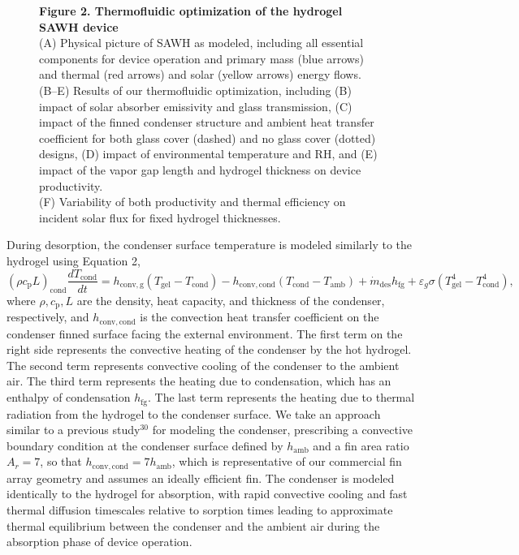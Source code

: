 \documentclass[11pt]{article}
\newcommand{\figbox}[1]{%
  \fbox{\parbox[c][#1][c]{0.92\textwidth}{\centering\itshape [figure image]}}}
\begin{document}
\begin{figure}[!ht]
\centering
\figbox{7cm}
\caption*{\textbf{Figure 2. Thermofluidic optimization of the hydrogel SAWH device}\\
(A) Physical picture of SAWH as modeled, including all essential components for device operation and primary mass (blue arrows) and thermal (red arrows) and solar (yellow arrows) energy flows.\\
(B--E) Results of our thermofluidic optimization, including (B) impact of solar absorber emissivity and glass transmission, (C) impact of the finned condenser structure and ambient heat transfer coefficient for both glass cover (dashed) and no glass cover (dotted) designs, (D) impact of environmental temperature and RH, and (E) impact of the vapor gap length and hydrogel thickness on device productivity.\\
(F) Variability of both productivity and thermal efficiency on incident solar flux for fixed hydrogel thicknesses.}
\end{figure}

During desorption, the condenser surface temperature is modeled similarly to the hydrogel using Equation 2,
\begin{equation}
\left(\rho c_{\mathrm{p}} L\right)_{\mathrm{cond}} \frac{dT_{\mathrm{cond}}}{dt} = h_{\mathrm{conv,g}}\left(T_{\mathrm{gel}} - T_{\mathrm{cond}}\right) - h_{\mathrm{conv,cond}}\left(T_{\mathrm{cond}} - T_{\mathrm{amb}}\right) + \dot{m}_{\mathrm{des}} h_{\mathrm{fg}} + \varepsilon_{g}\sigma\left(T_{\mathrm{gel}}^{4} - T_{\mathrm{cond}}^{4}\right),
\end{equation}
where $\rho, c_{\mathrm{p}}, L$ are the density, heat capacity, and thickness of the condenser, respectively, and $h_{\mathrm{conv,cond}}$ is the convection heat transfer coefficient on the condenser finned surface facing the external environment. The first term on the right side represents the convective heating of the condenser by the hot hydrogel. The second term represents convective cooling of the condenser to the ambient air. The third term represents the heating due to condensation, which has an enthalpy of condensation $h_{\mathrm{fg}}$. The last term represents the heating due to thermal radiation from the hydrogel to the condenser surface. We take an approach similar to a previous study$^{30}$ for modeling the condenser, prescribing a convective boundary condition at the condenser surface defined by $h_{\mathrm{amb}}$ and a fin area ratio $A_{r} = 7$, so that $h_{\mathrm{conv,cond}} = 7h_{\mathrm{amb}}$, which is representative of our commercial fin array geometry and assumes an ideally efficient fin. The condenser is modeled identically to the hydrogel for absorption, with rapid convective cooling and fast thermal diffusion timescales relative to sorption times leading to approximate thermal equilibrium between the condenser and the ambient air during the absorption phase of device operation.
\end{document}
